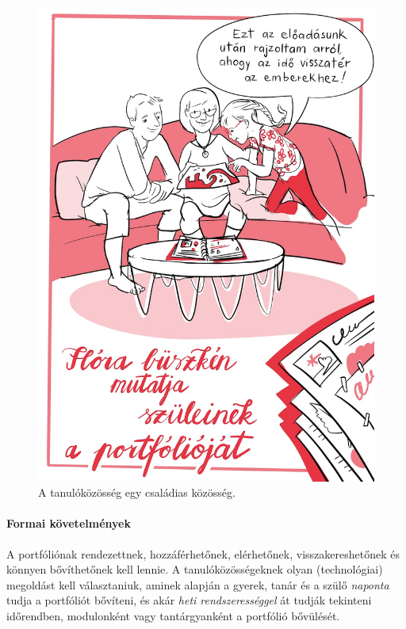 \begin{figure}
\centering
\includegraphics{pics/4b_portfolio_flora.jpg}
\caption{A tanulóközösség egy családias közösség.}
\end{figure}

\hypertarget{formai-kovetelmenyek}{%
\paragraph{Formai követelmények}\label{formai-kovetelmenyek}}

A portfóliónak rendezettnek, hozzáférhetőnek, elérhetőnek,
visszakereshetőnek és könnyen bővíthetőnek kell lennie.
A tanulóközösségeknek 
olyan
(technológiai) megoldást kell választaniuk,\break
aminek
alapján a gyerek, tanár és a szülő \emph{naponta} tudja a portfóliót
bővíteni, és akár \emph{heti rendszerességgel} át tudják tekinteni
időrendben, modulonként vagy tantárgyanként a portfólió bővülését.
